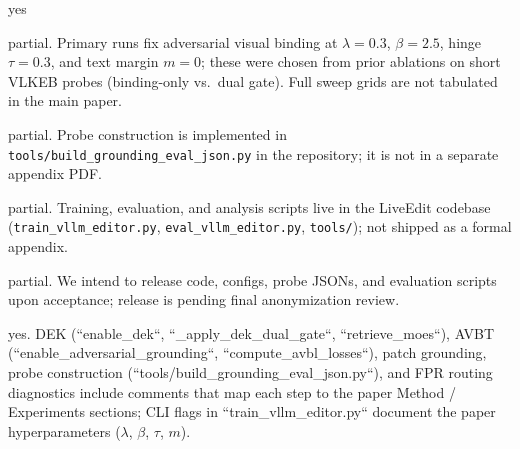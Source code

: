 \documentclass[letterpaper]{article}
\begin{document}
\begin{itemize}

yes

\begin{itemize}

	partial. Primary runs fix adversarial visual binding at $\lambda{=}0.3$, $\beta{=}2.5$, hinge $\tau{=}0.3$, and text margin $m{=}0$; these were chosen from prior ablations on short VLKEB probes (binding-only vs.\ dual gate). Full sweep grids are not tabulated in the main paper.

	partial. Probe construction is implemented in \texttt{tools/build\_grounding\_eval\_json.py} in the repository; it is not in a separate appendix PDF.

	partial. Training, evaluation, and analysis scripts live in the LiveEdit codebase (\texttt{train\_vllm\_editor.py}, \texttt{eval\_vllm\_editor.py}, \texttt{tools/}); not shipped as a formal appendix.

	partial. We intend to release code, configs, probe JSONs, and evaluation scripts upon acceptance; release is pending final anonymization review.

	yes. DEK (``enable_dek``, ``_apply_dek_dual_gate``, ``retrieve_moes``), AVBT (``enable_adversarial_grounding``, ``compute_avbl_losses``), patch grounding, probe construction (``tools/build_grounding_eval_json.py``), and FPR routing diagnostics include comments that map each step to the paper Method / Experiments sections; CLI flags in ``train_vllm_editor.py`` document the paper hyperparameters ($\lambda$, $\beta$, $\tau$, $m$).


\end{itemize}
\end{itemize}
\end{document}
